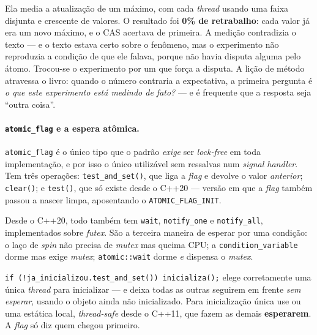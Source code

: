 \begin{porque}
Ela media a atualização de um máximo, com cada \emph{thread} usando uma faixa
disjunta e crescente de valores. O resultado foi \textbf{0\% de retrabalho}:
cada valor já era um novo máximo, e o CAS acertava de primeira. A medição
contradizia o texto --- e o texto estava certo sobre o fenômeno, mas o
experimento não reproduzia a condição de que ele falava, porque não havia
disputa alguma pelo átomo. Trocou-se o experimento por um que força a disputa. A
lição de método atravessa o livro: quando o número contraria a expectativa, a
primeira pergunta é \emph{o que este experimento está medindo de fato?} --- e é
frequente que a resposta seja ``outra coisa''.
\end{porque}

\paragraph{\texttt{atomic\_flag} e a espera atômica.} \texttt{atomic\_flag} é o
único tipo que o padrão \emph{exige} ser \emph{lock-free} em toda
implementação, e por isso o único utilizável sem ressalvas num \emph{signal
handler}. Tem três operações: \texttt{test\_and\_set()}, que liga a
\emph{flag} e devolve o valor \emph{anterior}; \texttt{clear()}; e
\texttt{test()}, que só existe desde o C++20 --- versão em que a \emph{flag}
também passou a nascer limpa, aposentando o \texttt{ATOMIC\_FLAG\_INIT}.

Desde o C++20, todo  também tem \texttt{wait},
\texttt{notify\_one} e \texttt{notify\_all}, implementados sobre \emph{futex}.
São a terceira maneira de esperar por uma condição: o laço de \emph{spin} não
precisa de \emph{mutex} mas queima CPU; a \texttt{condition\_variable} dorme mas
exige \emph{mutex}; \texttt{atomic::wait} dorme \emph{e} dispensa o
\emph{mutex}.

\begin{armadilha}
\texttt{if (!ja\_inicializou.test\_and\_set()) inicializa();} elege
corretamente uma única \emph{thread} para inicializar --- e deixa todas as
outras seguirem em frente \emph{sem esperar}, usando o objeto ainda não
inicializado. Para inicialização única use  ou uma
estática local, \emph{thread-safe} desde o C++11, que fazem as demais
\textbf{esperarem}. A \emph{flag} só diz quem chegou primeiro.
\end{armadilha}

